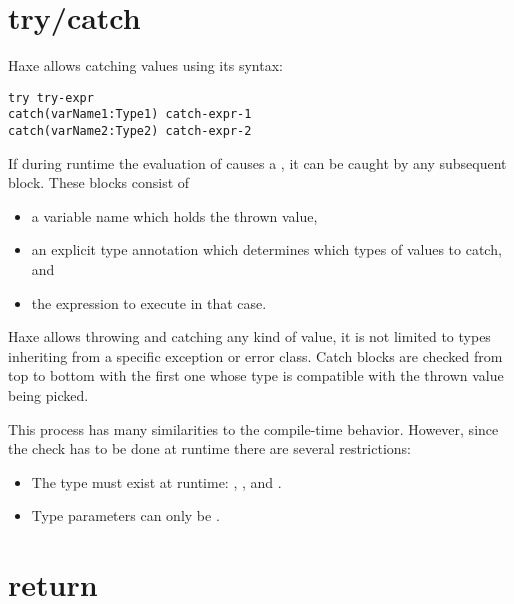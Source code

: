 \section{try/catch}
\label{expression-try-catch}

Haxe allows catching values using its  syntax:

\begin{lstlisting}
try try-expr
catch(varName1:Type1) catch-expr-1
catch(varName2:Type2) catch-expr-2
\end{lstlisting}

If during runtime the evaluation of  causes a , it can be caught by any subsequent  block. These blocks consist of

\begin{itemize}
	\item a variable name which holds the thrown value,
	\item an explicit type annotation which determines which types of values to catch, and
	\item the expression to execute in that case.
\end{itemize}

Haxe allows throwing and catching any kind of value, it is not limited to types inheriting from a specific exception or error class. Catch blocks are checked from top to bottom with the first one whose type is compatible with the thrown value being picked.

This process has many similarities to the compile-time  behavior. However, since the check has to be done at runtime there are several restrictions:

\begin{itemize}
	\item The type must exist at runtime: , ,  and .
	\item Type parameters can only be .
\end{itemize}



\section{return}
\label{expression-return}

